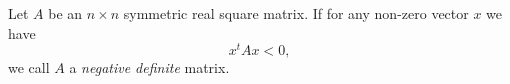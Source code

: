 \documentclass[12pt]{article}
\begin{document}
Let $A$ be an $n\times n$ symmetric real square matrix. If for any non-zero vector $x$ we have
$$x^t Ax<0,$$
we call $A$ a \emph{negative definite} matrix.
\end{document}
